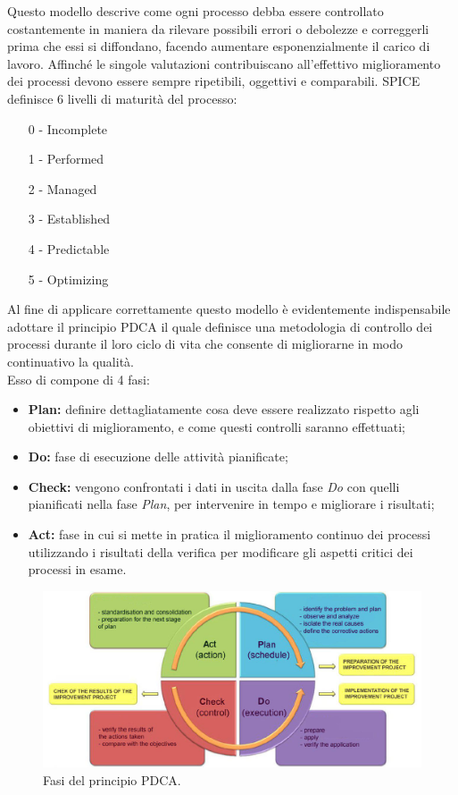 \documentclass[a4paper]{article}
\begin{document}
				Questo modello descrive come ogni processo debba essere controllato costantemente in maniera da 
				rilevare possibili errori o debolezze e correggerli prima che essi si diffondano, facendo 
				aumentare esponenzialmente il carico di lavoro. Affinché le singole valutazioni contribuiscano 
				all'effettivo miglioramento dei processi devono essere sempre ripetibili, oggettivi e comparabili.
				SPICE definisce 6 livelli di maturità del processo:
				\begin{itemize}
					\item[0] - Incomplete
					\item[1] - Performed
					\item[2] - Managed
					\item[3] - Established
					\item[4] - Predictable
					\item[5] - Optimizing					
				\end{itemize}
				Al fine di applicare correttamente questo modello è evidentemente indispensabile adottare il 
				principio PDCA il quale definisce una metodologia di controllo dei processi durante il loro 
				ciclo di vita che consente di migliorarne in modo continuativo la qualità. \\ 
				Esso di compone di 4 fasi:
				\begin{itemize}
					\item \textbf{Plan:} definire dettagliatamente cosa deve essere realizzato rispetto agli 
					obiettivi di miglioramento, e come questi controlli saranno effettuati;
					\item \textbf{Do:} fase di esecuzione delle attività pianificate;
					\item \textbf{Check:} vengono confrontati i dati in uscita dalla fase \emph{Do} con quelli 
					pianificati nella fase \emph{Plan}, per intervenire in tempo e migliorare i risultati;
					\item \textbf{Act:} fase in cui si mette in pratica il miglioramento continuo dei processi
					 utilizzando i risultati della verifica per modificare gli aspetti critici dei processi in esame.
				\end{itemize}
				\begin{figure}[H]
					\centering
					\includegraphics[scale=0.4]{immagini/Pdq/PDCA.jpg}
					\caption{Fasi del principio PDCA.}
				\end{figure}
\end{document}
